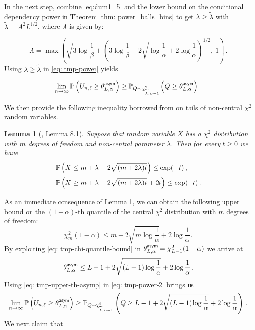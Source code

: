 \documentclass[11pt]{article}
\newtheorem{lemma}[propo]{Lemma}
\begin{document}
In the next step, combine \eqref{eq:dum1_5} and the lower bound on the conditional dependency power in Theorem \eqref{thm: power_balls_bins} to get $\lambda \geq \widetilde{\lambda}$ with $\widetilde{\lambda}=A^2 L^{1/2}$, where $A$ is given by:

\begin{equation}\label{eq: tmp-A}
A=\max\left(\sqrt{3\log\frac{1}{\beta}}+\left( 3\log\frac{1}{\beta} +  2\sqrt{\log\frac{1}{\alpha}}+2\log\frac{1}{\alpha} \right)^{1/2} ,~1  \right)\,.
\end{equation}
Using $\lambda\geq \widetilde{\lambda}$ in \eqref{eq: tmp-power} yields

\begin{equation}\label{eq: tmp-power-2}
\lim\limits_{n\rightarrow \infty}^{} {\mathbb P}\left(U_{n,\ell}\geq \theta^{\mathsf{asym}}_{L,\alpha} \right)\geq {\mathbb P}_{Q\sim  \chi^2_{\widetilde{\lambda},L-1}} \left(Q\geq \theta^{\mathsf{asym}}_{L,\alpha} \right)\,.
\end{equation}

We then provide the following inequality borrowed from \cite{birge2001alternative} on tails of non-central $\chi^2$ random variables.

\begin{lemma}[\cite{birge2001alternative}, Lemma 8.1]\label{lemma: chi-tails}
Suppose that  random variable $X$ has a $\chi^2$ distribution with $m$ degrees of freedom and non-central parameter $\lambda$. Then for every $t\geq 0$  we have 
\begin{align*}
&{\mathbb P}\left(X\leq m+\lambda -2\sqrt{(m+2\lambda)t}\right) \leq \exp(-t)\,,\\
&{\mathbb P}\left(X\geq m+\lambda +2\sqrt{(m+2\lambda)t}+2t\right) \leq \exp(-t)\,.
\end{align*}
 \end{lemma}
As an immediate consequence of Lemma \ref{lemma: chi-tails}, we can obtain the following upper bound on the  $(1-\alpha)$-th quantile of the central $\chi^2$ distribution with $m$ degrees of freedom:
 \begin{equation}\label{eq: tmp-chi-quantile-bound}
\chi^2_{m}(1-\alpha) \leq m+2\sqrt{m\log\frac{1}{\alpha}} + 2\log\frac{1}{\alpha}\,.
 \end{equation}
By exploiting \eqref{eq: tmp-chi-quantile-bound} in $\theta^{\mathsf{asym}}_{L,\alpha}=\chi^2_{L-1}(1-\alpha)$ we arrive at
\begin{equation}\label{eq: tmp-upper-th-asymp}
\theta^{\mathsf{asym}}_{L,\alpha}\leq L-1+2\sqrt{(L-1)\log\frac{1}{\alpha}} + 2\log\frac{1}{\alpha}\,.
\end{equation}
Using  \eqref{eq: tmp-upper-th-asymp} in \eqref{eq: tmp-power-2} brings us
\begin{equation} \label{eq: tmp-power-3}
\lim\limits_{n\rightarrow \infty}^{} {\mathbb P}\left(U_{n,\ell}\geq \theta^{\mathsf{asym}}_{L,\alpha} \right)\geq {\mathbb P}_{Q\sim  \chi^2_{\widetilde{\lambda},L-1}} \left(Q\geq L-1+2\sqrt{(L-1)\log\frac{1}{\alpha}} + 2\log\frac{1}{\alpha}  \right)\,.
\end{equation}
We next claim that 
\end{document}
